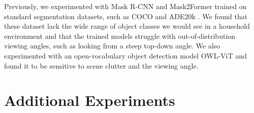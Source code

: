 \documentclass{article}
\newcommand{\ob}[1]{\textcolor{purple}{[\textbf{OB:} #1]}}
\begin{document}
Previously, we experimented with Mask R-CNN \cite{he17mask} and Mask2Former \cite{cheng22maskedattention} trained on standard segmentation datasets, such as COCO \cite{lin15microsoft} and ADE20k \cite{scene}. We found that these dataset lack the wide range of object classes we would see in a household environment and that the trained models struggle with out-of-distribution viewing angles, such as looking from a steep top-down angle. We also experimented with an open-vocabulary object detection model OWL-ViT \cite{minderer22simple} and found it to be sensitive to scene clutter and the viewing angle.


\section{Additional Experiments}
\end{document}
